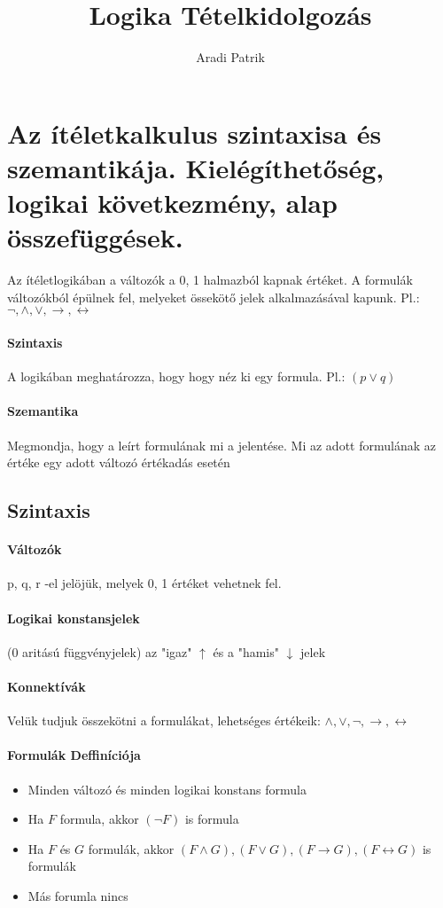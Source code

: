 \documentclass[10pt,a4paper]{article}
\author{Aradi Patrik}
\title{Logika Tételkidolgozás}
\begin{document}
\maketitle
\newpage
\section{Az ítéletkalkulus szintaxisa és szemantikája. Kielégíthetőség, logikai következmény, alap összefüggések.}

Az ítéletlogikában a változók a {0, 1} halmazból kapnak értéket. \newline A formulák változókból épülnek fel, melyeket össekötő jelek alkalmazásával kapunk. Pl.: $\neg, \wedge, \vee, \rightarrow, \leftrightarrow$
\paragraph{Szintaxis}
A logikában meghatározza, hogy hogy néz ki egy formula. \newline Pl.: $(p \vee q)$
\paragraph{Szemantika}
Megmondja, hogy a leírt formulának mi a jelentése. Mi az adott formulának az értéke egy adott változó értékadás esetén
\subsection{Szintaxis}
\paragraph{Változók}
p, q, r -el jelöjük, melyek {0, 1} értéket vehetnek fel.
\paragraph{Logikai konstansjelek}
(0 aritású függvényjelek) az "igaz" $\uparrow$ és a "hamis" $\downarrow$ jelek
\paragraph{Konnektívák}
Velük tudjuk összekötni a formulákat, lehetséges értékeik: $\wedge, \vee, \neg, \rightarrow, \leftrightarrow $
\paragraph{Formulák Deffiníciója}
\begin{itemize}
\item Minden változó és minden logikai konstans formula
\item Ha $F$ formula, akkor $(\neg F)$ is formula
\item Ha $F$ és $G$ formulák, akkor $(F \wedge G), (F \vee G), (F \rightarrow G), (F \leftrightarrow G)$ is formulák
\item Más forumla nincs
\end{itemize}
\end{document}
